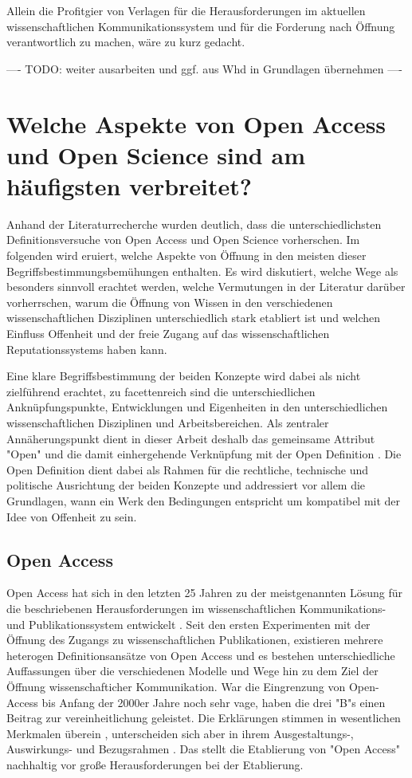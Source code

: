 Allein die Profitgier von Verlagen für die Herausforderungen im aktuellen wissenschaftlichen Kommunikationssystem und für die Forderung nach Öffnung verantwortlich zu machen, wäre zu kurz gedacht.

---- TODO: weiter ausarbeiten und ggf. aus Whd in Grundlagen übernehmen ----

\section{Welche Aspekte von Open Access und Open Science sind am häufigsten verbreitet?}

Anhand der Literaturrecherche wurden deutlich, dass die unterschiedlichsten Definitionsversuche von Open Access und Open Science vorherschen. Im folgenden wird eruiert, welche Aspekte von Öffnung in den meisten dieser Begriffsbestimmungsbemühungen enthalten. Es wird diskutiert, welche Wege als besonders sinnvoll erachtet werden, welche Vermutungen in der Literatur darüber vorherrschen, warum die Öffnung von Wissen in den verschiedenen wissenschaftlichen Disziplinen unterschiedlich stark etabliert ist und welchen Einfluss Offenheit und der freie Zugang auf das wissenschaftlichen Reputationssystems haben kann.

Eine klare Begriffsbestimmung der beiden Konzepte wird dabei als nicht zielführend erachtet, zu facettenreich sind die unterschiedlichen Anknüpfungspunkte, Entwicklungen und Eigenheiten in den unterschiedlichen wissenschaftlichen Disziplinen und Arbeitsbereichen. Als zentraler Annäherungspunkt dient in dieser Arbeit deshalb das gemeinsame Attribut "Open" und die damit einhergehende Verknüpfung mit der Open Definition \cite{open_definition}. Die Open Definition dient dabei als Rahmen für die rechtliche, technische und politische Ausrichtung der beiden Konzepte und addressiert vor allem die Grundlagen, wann ein Werk den Bedingungen entspricht um kompatibel mit der Idee von Offenheit zu sein.

\subsection{Open Access}

Open Access hat sich in den letzten 25 Jahren zu der meistgenannten Lösung für die beschriebenen Herausforderungen im wissenschaftlichen Kommunikations- und Publikationssystem entwickelt \cite{brembs2015open}. Seit den ersten Experimenten mit der Öffnung des Zugangs zu wissenschaftlichen Publikationen, existieren mehrere heterogen Definitionsansätze von Open Access und es bestehen unterschiedliche Auffassungen über die verschiedenen Modelle und Wege hin zu dem Ziel der Öffnung wissenschafticher Kommunikation. War die Eingrenzung von Open-Access bis Anfang der 2000er Jahre noch sehr vage, haben die drei "B"s einen Beitrag zur vereinheitlichung geleistet. Die Erklärungen stimmen in wesentlichen Merkmalen überein \cite{albert_2006_open_implications}, unterscheiden sich aber in ihrem Ausgestaltungs-, Auswirkungs- und Bezugsrahmen \cite{naeder_2010_open}. Das stellt die Etablierung von "Open Access" nachhaltig vor große Herausforderungen bei der Etablierung.

